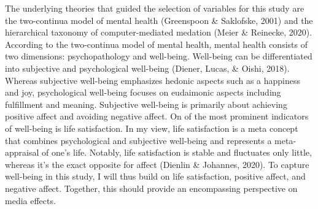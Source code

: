 \documentclass[
  english,
  man,mask,floatsintext]{apa6}
\begin{document}
The underlying theories that guided the selection of variables for this study are the two-continua model of mental health (Greenspoon \& Saklofske, 2001) and the hierarchical taxonomy of computer-mediated medation (Meier \& Reinecke, 2020).
According to the two-continua model of mental health, mental health consists of two dimensions: psychopathology and well-being.
Well-being can be differentiated into subjective and psychological well-being (Diener, Lucas, \& Oishi, 2018).
Whereas subjective well-being emphasizes hedonic aspects such as a happiness and joy, psychological well-being focuses on eudaimonic aspects including fulfillment and meaning.
Subjective well-being is primarily about achieving positive affect and avoiding negative affect.
On of the most prominent indicators of well-being is life satisfaction.
In my view, life satisfaction is a meta concept that combines psychological and subjective well-being and represents a meta-appraisal of one's life.
Notably, life satisfaction is stable and fluctuates only little, whereas it's the exact opposite for affect (Dienlin \& Johannes, 2020).
To capture well-being in this study, I will thus build on life satisfaction, positive affect, and negative affect.
Together, this should provide an encompassing perspective on media effects.
\end{document}
